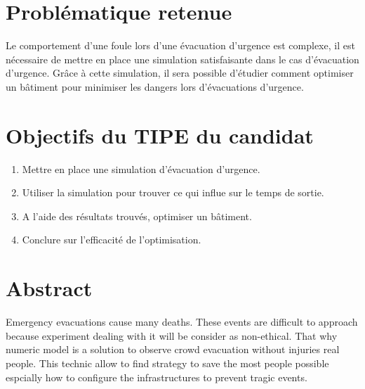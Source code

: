 \documentclass[12pt]{article}
\begin{document}
\section*{Problématique retenue}
Le comportement d'une foule lors d'une évacuation d'urgence est complexe, il est nécessaire de mettre en place une simulation satisfaisante dans le cas d'évacuation d'urgence.
\newline\newline
Grâce à cette simulation, il sera possible d'étudier comment optimiser un bâtiment pour minimiser les dangers lors d'évacuations d'urgence.

\section*{Objectifs du TIPE du candidat}
\begin{enumerate}
    \item Mettre en place une simulation d'évacuation d'urgence.
    \item Utiliser la simulation pour trouver ce qui influe sur le temps de sortie.
    \item A l'aide des résultats trouvés, optimiser un bâtiment.
    \item Conclure sur l'efficacité de l'optimisation.
\end{enumerate}

\section*{Abstract}
Emergency evacuations cause many deaths. These events are difficult to approach because experiment dealing with it
will be consider as non-ethical. That why numeric model is a solution to observe crowd evacuation without injuries real people.
This technic allow to find strategy to save the most people possible espcially how to configure the infrastructures to prevent tragic events.
\end{document}
